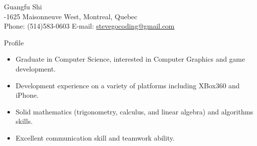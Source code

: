 \documentclass[10pt]{article}
\newenvironment{myitemize}{\begin{itemize} %
        \setlength{\itemsep}{0.25em} 
        \setlength{\topsep}{\itemsep} 
        \setlength{\labelsep}{1em}
        \setlength{\parskip}{0em}
        \setlength{\partopsep}{0em}
}%
{ \end{itemize} }
\begin{document}
 
\date{}
\newlength{\oldcvlabelwidth}
\newlength{\oldcvlabelsep}



\begin{cv} {{\large Guangfu Shi}\\
    { \normalsize {}-1625 Maisonneuve West, Montreal, Quebec \\ 
    Phone: {\mdseries (514)583-0603}  
    \hfill E-mail: {\mdseries \href{mailto:stevegocoding@gmail.com} {stevegocoding@gmail.com}}
    }
}


\setlength{\oldcvlabelwidth}{\cvlabelwidth}
\setlength{\oldcvlabelsep}{\cvlabelsep}
\setlength{\cvlabelwidth}{0.5em}

%

\begin{cvlist}{Profile} 
\item
    \begin{myitemize}
        \item Graduate in Computer Science, interested in Computer Graphics and game development.  
            
        
        \item Development experience on a variety of platforms including XBox360 and iPhone.
           
        \item Solid mathematics (trigonometry, calculus, and linear algebra) and algorithms skills. 
            
        \item Excellent communication skill and teamwork ability. 

    \end{myitemize}
\end{cvlist}


\setlength{\cvlabelwidth}{1em}


\end{cv}
\end{document}
